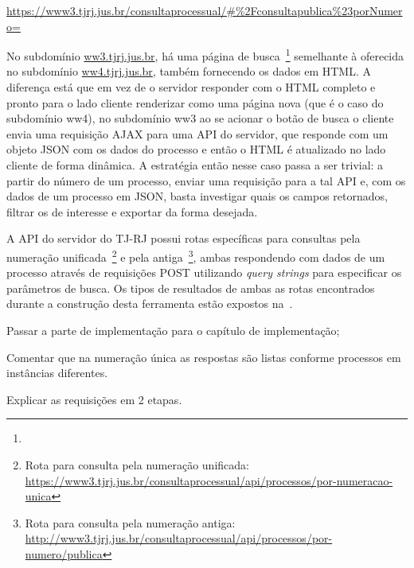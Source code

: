 \urldef\urlConsultaJson\url{https://www3.tjrj.jus.br/consultaprocessual/#%2Fconsultapublica%23porNumero=}

No subdomínio \url{ww3.tjrj.jus.br}, há uma página de
busca~\footnote{\urlConsultaJson} semelhante à oferecida no subdomínio
\url{ww4.tjrj.jus.br}, também fornecendo os dados em HTML. A diferença está que
em vez de o servidor responder com o HTML completo e pronto para o lado cliente
renderizar como uma página nova (que é o caso do subdomínio ww4), no subdomínio
ww3 ao se acionar o botão de busca o cliente envia uma requisição AJAX para uma
API do servidor, que responde com um objeto JSON com os dados do processo e
então o HTML é atualizado no lado cliente de forma dinâmica. A estratégia então
nesse caso passa a ser trivial: a partir do número de um processo, enviar uma
requisição para a tal API e, com os dados de um processo em JSON, basta
investigar quais os campos retornados, filtrar os de interesse e exportar da
forma desejada.

A API do servidor do TJ-RJ possui rotas específicas para consultas pela
numeração unificada~\footnote{Rota para consulta pela numeração unificada:
\url{https://www3.tjrj.jus.br/consultaprocessual/api/processos/por-numeracao-unica}}
e pela antiga~\footnote{Rota para consulta pela numeração antiga:
\url{http://www3.tjrj.jus.br/consultaprocessual/api/processos/por-numero/publica}},
ambas respondendo com dados de um processo através de requisições POST
utilizando \textit{query strings} para especificar os parâmetros de busca.
Os tipos de resultados de ambas as rotas encontrados durante a construção desta
ferramenta estão expostos na~.

\begin{todolist}
    \item Passar a parte de implementação para o capítulo de implementação;
    \item Comentar que na numeração única as respostas são listas conforme
        processos em instâncias diferentes.
    \item Explicar as requisições em 2 etapas.
\end{todolist}


